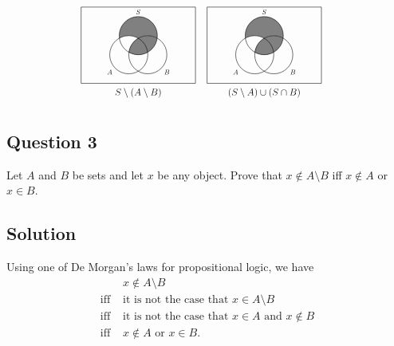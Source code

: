 \documentclass{article}
\begin{document}
        \vspace{-\belowdisplayskip}
        \vspace{-\abovedisplayskip}
        \begin{align*}
        &\begin{tikzpicture}[fill=gray, scale = .6, transform shape]
            \scope
            \clip (-2.5,-2) rectangle (2.5,2)
                  (-.5,-.5) circle (1)
                  (.5,-.5) circle (1);
            \fill (0,.5) circle (1);
            \endscope
            \scope
            \clip (0,.5) circle (1);
            \fill (.5,-.5) circle (1);
            \endscope
            \draw (-.5,-.5) circle (1) (-1.5,-1.41) node [text=black] {$A$}
                  (0,.5) circle (1) (0,1.5)  node [text=black, above] {$S$}
                  (.5,-.5) circle (1) (1.5,-1.41) node [text=black] {$B$}
                  (-3,-2) rectangle (3,2)
                  (0, -2.5) node {{\Large $S \setminus (A \setminus B)$}};
        \end{tikzpicture} &
        &\begin{tikzpicture}[fill=gray, scale = .6, transform shape]
            \scope
            \clip (-2.5,-2) rectangle (2.5,2)
                  (-.5,-.5) circle (1)
                  (.5,-.5) circle (1);
            \fill (0,.5) circle (1);
            \endscope
            \scope
            \clip (0,.5) circle (1);
            \fill (.5,-.5) circle (1);
            \endscope
            \draw (-.5,-.5) circle (1) (-1.5,-1.41) node [text=black] {$A$}
                  (0,.5) circle (1) (0,1.5)  node [text=black, above] {$S$}
                  (.5,-.5) circle (1) (1.5,-1.41) node [text=black] {$B$}
                  (-3,-2) rectangle (3,2)
                  (0, -2.5) node {{\Large $(S \setminus A) \cup (S \cap B)$}};
        \end{tikzpicture}
        \end{align*}


\subsection*{Question 3}
    Let $A$ and $B$ be sets and let $x$ be any object. Prove that $x \notin A \setminus B$ iff $x \notin A$ or $x \in B$.

\subsection*{Solution}
    Using one of De Morgan's laws for propositional logic, we have 
    \begin{align*}
        & x \notin A \setminus B \\
        \text{iff } & \text{it is not the case that $x \in A \setminus B$} \\
        \text{iff } & \text{it is not the case that $x \in A$ and $x \notin B$} \\
        \text{iff } & \text{$x \notin A$ or $x \in B$}.
    \end{align*}
\end{document}
